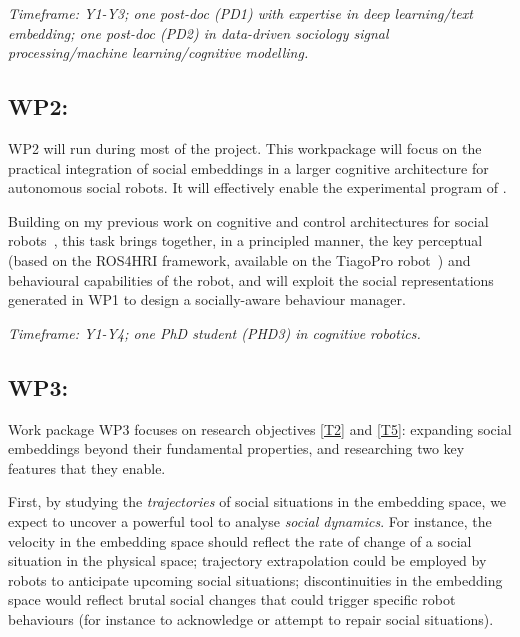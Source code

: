 \vspace{1em}
\noindent\emph{ Timeframe: Y1-Y3; one post-doc (PD1) with expertise in
    deep learning/text embedding; one post-doc (PD2) in data-driven sociology
signal processing/machine learning/cognitive modelling.}

\subsection{WP2: \textbf{\wpTwo}}

WP2 will run during most of the project. This workpackage will focus on the
practical integration of social embeddings in a larger cognitive architecture
for autonomous social robots. It will effectively enable the experimental
program of \project.

Building on my previous work on cognitive and control architectures for social
robots~\cite{lemaignan2017artificial,lemaignan2015pyrobots,baxter2016cognitive,lemaignan2014challenges,lemaignan2011what},
this task brings together, in a principled manner, the key perceptual (based on
the ROS4HRI framework, available on the TiagoPro robot~\cite{ros2023ros4hri})
and behavioural capabilities of the robot, and will exploit the social
representations generated in WP1 to design a socially-aware behaviour manager.

\vspace{1em}
\noindent\emph{Timeframe: Y1-Y4; one PhD student (PHD3) in cognitive
    robotics.}


\subsection{WP3: \textbf{\wpThree}} 

Work package WP3 focuses on research objectives \ref{T2} and \ref{T5}: expanding
social embeddings beyond their fundamental properties, and researching two key
features that they enable.

First, by studying the \emph{trajectories} of social situations in the embedding
space, we expect to uncover a powerful tool to analyse \emph{social dynamics}.
For instance, the velocity in the embedding space should reflect the rate of
change of a social situation in the physical space; trajectory extrapolation
could be employed by robots to anticipate upcoming social situations;
discontinuities in the embedding space would reflect brutal social changes that
could trigger specific robot behaviours (for instance to acknowledge or attempt
to repair social situations).

